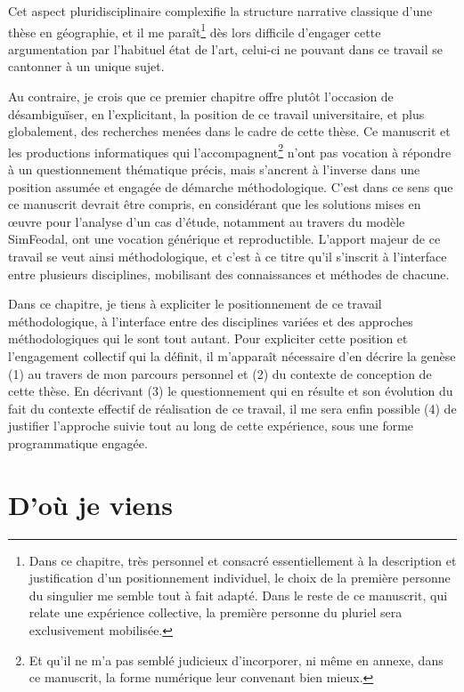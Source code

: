 Cet aspect pluridisciplinaire complexifie la structure narrative classique d'une thèse en géographie, et il me paraît\footnote{
	Dans ce chapitre, très personnel et consacré essentiellement à la description et justification d'un positionnement individuel, le choix de la première personne du singulier me semble tout à fait adapté.
	Dans le reste de ce manuscrit, qui relate une expérience collective, la première personne du pluriel sera exclusivement mobilisée.
} dès lors difficile d'engager cette argumentation par l'habituel état de l'art, celui-ci ne pouvant dans ce travail se cantonner à un unique sujet.

Au contraire, je crois que ce premier chapitre offre plutôt l'occasion de désambiguïser, en l'explicitant, la position de ce travail universitaire, et plus globalement, des recherches menées dans le cadre de cette thèse.
Ce manuscrit et les productions informatiques qui l'accompagnent\footnote{
	Et qu'il ne m'a pas semblé judicieux d'incorporer, ni même en annexe, dans ce manuscrit, la forme numérique leur convenant bien mieux.
} n'ont pas vocation à répondre à un questionnement thématique précis, mais s'ancrent à l'inverse dans une position assumée et engagée de démarche méthodologique.
C'est dans ce sens que ce manuscrit devrait être compris, en considérant que les solutions mises en œuvre pour l'analyse d'un cas d'étude, notamment au travers du modèle SimFeodal, ont une vocation générique et reproductible.
L'apport majeur de ce travail se veut ainsi méthodologique, et c'est à ce titre qu'il s'inscrit à l'interface entre plusieurs disciplines, mobilisant des connaissances et méthodes de chacune.

Dans ce chapitre, je tiens à expliciter le positionnement de ce travail méthodologique, à l'interface entre des disciplines variées et des approches méthodologiques qui le sont tout autant.
Pour expliciter cette position et l'engagement collectif qui la définit, il m'apparaît nécessaire d'en décrire la genèse (1) au travers de mon parcours personnel et (2) du contexte de conception de cette thèse.
En décrivant (3) le questionnement qui en résulte et son évolution du fait du contexte effectif de réalisation de ce travail, il me sera enfin possible (4) de justifier l'approche suivie tout au long de cette expérience, sous une forme programmatique engagée.


\section{D'où je viens \label{sec:formation}}

